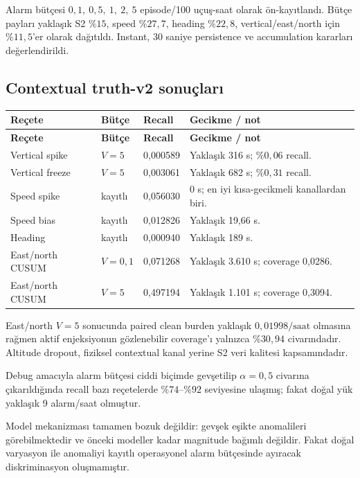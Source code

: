 \documentclass[11pt,a4paper,oneside]{report}
\begin{document}
Alarm bütçesi \(0{,}1,\ 0{,}5,\ 1,\ 2,\ 5\) episode/100 uçuş-saat olarak
ön-kayıtlandı. Bütçe payları yaklaşık S2 \(\%15\), speed \(\%27{,}7\),
heading \(\%22{,}8\), vertical/east/north için \(\%11{,}5\)'er olarak
dağıtıldı. Instant, 30 saniye persistence ve accumulation kararları
değerlendirildi.

\subsection{Contextual truth-v2 sonuçları}

\begin{longtable}{L{0.25\textwidth}L{0.15\textwidth}L{0.18\textwidth}L{0.31\textwidth}}
\toprule
\textbf{Reçete} & \textbf{Bütçe} & \textbf{Recall} & \textbf{Gecikme / not}\\
\midrule
\endfirsthead
\toprule
\textbf{Reçete} & \textbf{Bütçe} & \textbf{Recall} & \textbf{Gecikme / not}\\
\midrule
\endhead
Vertical spike & \(V=5\) & 0,000589 & Yaklaşık 316 s; \(\%0{,}06\) recall.\\
Vertical freeze & \(V=5\) & 0,003061 & Yaklaşık 682 s; \(\%0{,}31\) recall.\\
Speed spike & kayıtlı & 0,056030 & 0 s; en iyi kısa-gecikmeli kanallardan biri.\\
Speed bias & kayıtlı & 0,012826 & Yaklaşık 19,66 s.\\
Heading & kayıtlı & 0,000940 & Yaklaşık 189 s.\\
East/north CUSUM & \(V=0{,}1\) & 0,071268 & Yaklaşık 3.610 s; coverage 0,0286.\\
East/north CUSUM & \(V=5\) & 0,497194 & Yaklaşık 1.101 s; coverage 0,3094.\\
\bottomrule
\end{longtable}

East/north \(V=5\) sonucunda paired clean burden yaklaşık
\(0{,}01998/\text{saat}\) olmasına rağmen aktif enjeksiyonun gözlenebilir
coverage'ı yalnızca \(\%30{,}94\) civarındadır. Altitude dropout, fiziksel
contextual kanal yerine S2 veri kalitesi kapsamındadır.

Debug amacıyla alarm bütçesi ciddi biçimde gevşetilip \(\alpha=0{,}5\)
civarına çıkarıldığında recall bazı reçetelerde \(\%74\)--\(\%92\) seviyesine
ulaşmış; fakat doğal yük yaklaşık 9 alarm/saat olmuştur.

\begin{successbox}
Model mekanizması tamamen bozuk değildir: gevşek eşikte anomalileri
görebilmektedir ve önceki modeller kadar magnitude bağımlı değildir. Fakat
doğal varyasyon ile anomaliyi kayıtlı operasyonel alarm bütçesinde ayıracak
diskriminasyon oluşmamıştır.
\end{successbox}
\end{document}
